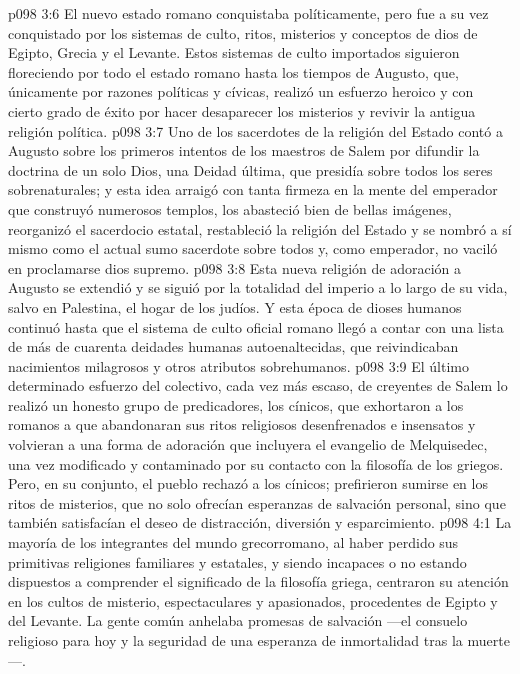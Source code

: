 \vs p098 3:6 \pc El nuevo estado romano conquistaba políticamente, pero fue a su vez conquistado por los sistemas de culto, ritos, misterios y conceptos de dios de Egipto, Grecia y el Levante. Estos sistemas de culto importados siguieron floreciendo por todo el estado romano hasta los tiempos de Augusto, que, únicamente por razones políticas y cívicas, realizó un esfuerzo heroico y con cierto grado de éxito por hacer desaparecer los misterios y revivir la antigua religión política.
\vs p098 3:7 Uno de los sacerdotes de la religión del Estado contó a Augusto sobre los primeros intentos de los maestros de Salem por difundir la doctrina de un solo Dios, una Deidad última, que presidía sobre todos los seres sobrenaturales; y esta idea arraigó con tanta firmeza en la mente del emperador que construyó numerosos templos, los abasteció bien de bellas imágenes, reorganizó el sacerdocio estatal, restableció la religión del Estado y se nombró a sí mismo como el actual sumo sacerdote sobre todos y, como emperador, no vaciló en proclamarse dios supremo.
\vs p098 3:8 Esta nueva religión de adoración a Augusto se extendió y se siguió por la totalidad del imperio a lo largo de su vida, salvo en Palestina, el hogar de los judíos. Y esta época de dioses humanos continuó hasta que el sistema de culto oficial romano llegó a contar con una lista de más de cuarenta deidades humanas autoenaltecidas, que reivindicaban nacimientos milagrosos y otros atributos sobrehumanos.
\vs p098 3:9 \pc El último determinado esfuerzo del colectivo, cada vez más escaso, de creyentes de Salem lo realizó un honesto grupo de predicadores, los cínicos, que exhortaron a los romanos a que abandonaran sus ritos religiosos desenfrenados e insensatos y volvieran a una forma de adoración que incluyera el evangelio de Melquisedec, una vez modificado y contaminado por su contacto con la filosofía de los griegos. Pero, en su conjunto, el pueblo rechazó a los cínicos; prefirieron sumirse en los ritos de misterios, que no solo ofrecían esperanzas de salvación personal, sino que también satisfacían el deseo de distracción, diversión y esparcimiento.
\vs p098 4:1 La mayoría de los integrantes del mundo grecorromano, al haber perdido sus primitivas religiones familiares y estatales, y siendo incapaces o no estando dispuestos a comprender el significado de la filosofía griega, centraron su atención en los cultos de misterio, espectaculares y apasionados, procedentes de Egipto y del Levante. La gente común anhelaba promesas de salvación ---el consuelo religioso para hoy y la seguridad de una esperanza de inmortalidad tras la muerte---.
